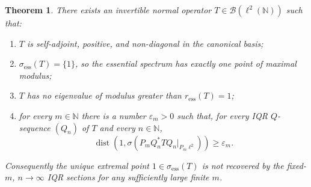 \documentclass[11pt]{article}
\newtheorem{theorem}{Theorem}
\newcommand{\N}{\mathbb N}
\newcommand{\ess}{\mathrm{ess}}
\newcommand{\dist}{\operatorname{dist}}
\begin{document}
\begin{theorem}
There exists an invertible normal operator \(T\in\mathcal B(\ell^2(\N))\) such
that:
\begin{enumerate}
\item \(T\) is self-adjoint, positive, and non-diagonal in the canonical basis;
\item \(\sigma_{\ess}(T)=\{1\}\), so the essential spectrum has exactly one
point of maximal modulus;
\item \(T\) has no eigenvalue of modulus greater than \(r_{\ess}(T)=1\);
\item for every \(m\in\N\) there is a number \(\varepsilon_m>0\) such that, for
every IQR \(Q\)-sequence \((Q_n)\) of \(T\) and every \(n\in\N\),
\[
  \dist\!\left(1,\sigma(P_mQ_n^*TQ_n\vert_{P_m\ell^2})\right)
  \geq \varepsilon_m.
\]
\end{enumerate}
Consequently the unique extremal point \(1\in\sigma_{\ess}(T)\) is not recovered
by the fixed-\(m\), \(n\to\infty\) IQR sections for any sufficiently large finite
\(m\).
\end{theorem}
\end{document}
